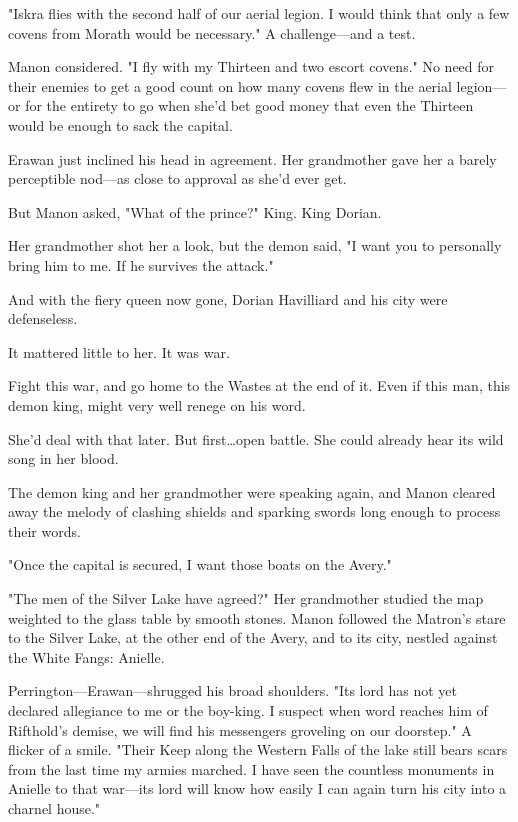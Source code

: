 "Iskra flies with the second half of our aerial legion.
I would think that only a few covens from Morath would be necessary."
A challenge---and a test.

Manon considered.
"I fly with my Thirteen and two escort covens."
No need for their enemies to get a good count on how many covens flew in the aerial legion---or for the entirety to go when she'd bet good money that even the Thirteen would be enough to sack the capital.

Erawan just inclined his head in agreement.
Her grandmother gave her a barely perceptible nod---as close to approval as she'd ever get.

But Manon asked, "What of the prince?"
King.
King Dorian.

Her grandmother shot her a look, but the demon said, "I want you to personally bring him to me.
If he survives the attack."

And with the fiery queen now gone, Dorian Havilliard and his city were defenseless.

It mattered little to her.
It was war.

Fight this war, and go home to the Wastes at the end of it.
Even if this man, this demon king, might very well renege on his word.

She'd deal with that later.
But first\ldots open battle.
She could already hear its wild song in her blood.

The demon king and her grandmother were speaking again, and Manon cleared away the melody of clashing shields and sparking swords long enough to process their words.

"Once the capital is secured, I want those boats on the Avery."

"The men of the Silver Lake have agreed?"
Her grandmother studied the map weighted to the glass table by smooth stones.
Manon followed the Matron's stare to the Silver Lake, at the other end of the Avery, and to its city, nestled against the White Fangs: Anielle.

Perrington---Erawan---shrugged his broad shoulders.
"Its lord has not yet declared allegiance to me or the boy-king.
I suspect when word reaches him of Rifthold's demise, we will find his messengers groveling on our doorstep."
A flicker of a smile.
"Their Keep along the Western Falls of the lake still bears scars from the last time my armies marched.
I have seen the countless monuments in Anielle to that war---its lord will know how easily I can again turn his city into a charnel house."

